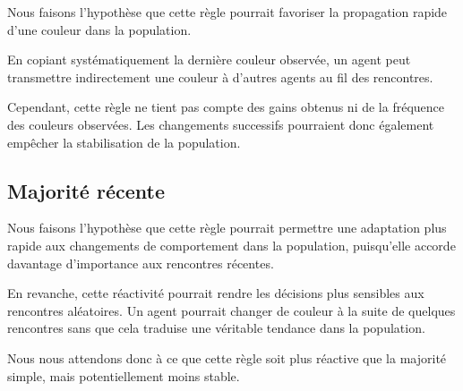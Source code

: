 \documentclass[12pt,a4paper]{article}
\begin{document}
Nous faisons l'hypothèse que cette règle pourrait favoriser
la propagation rapide d'une couleur dans la population.

En copiant systématiquement la dernière couleur observée,
un agent peut transmettre indirectement une couleur à d'autres
agents au fil des rencontres.

Cependant, cette règle ne tient pas compte des gains obtenus
ni de la fréquence des couleurs observées. Les changements
successifs pourraient donc également empêcher la stabilisation
de la population.

\subsection{Majorité récente}

Nous faisons l'hypothèse que cette règle pourrait permettre
une adaptation plus rapide aux changements de comportement
dans la population, puisqu'elle accorde davantage d'importance
aux rencontres récentes.

En revanche, cette réactivité pourrait rendre les décisions
plus sensibles aux rencontres aléatoires. Un agent pourrait
changer de couleur à la suite de quelques rencontres sans que
cela traduise une véritable tendance dans la population.

Nous nous attendons donc à ce que cette règle soit plus réactive
que la majorité simple, mais potentiellement moins stable.
\end{document}
